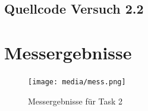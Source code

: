 \documentclass[12pt, oneside, a4paper, \docLanguage]{report}
\begin{document}
\subsection{Quellcode Versuch 2.2}
\label{chap:APPENDIX_SOURCECODE_V2.2}

\newpage
\section{Messergebnisse}
\label{chap:APPENDIX_MEASUREMENT_SOURCE}
\begin{figure}[H]
	\centering\small
	\texttt{[image: media/mess.png]}
	\caption{Messergebnisse für Task 2}
	\label{img:Messergebnisse für Task 2}
\end{figure}
%
%

\end{document}
